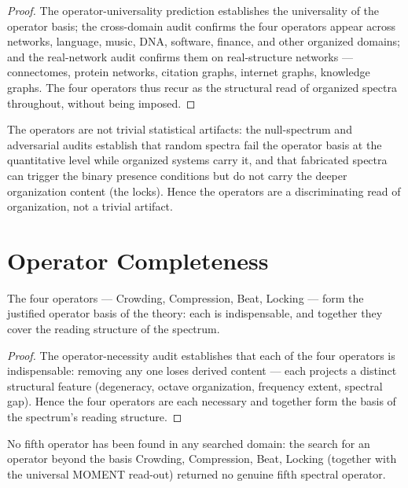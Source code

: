 \begin{proof}
The operator-universality prediction \cite{c07:QG300} establishes the universality of the
operator basis; the cross-domain audit \cite{c07:QG302} confirms the four operators appear
across networks, language, music, DNA, software, finance, and other organized domains; and
the real-network audit \cite{c07:QG304} confirms them on real-structure networks ---
connectomes, protein networks, citation graphs, internet graphs, knowledge graphs. The four
operators thus recur as the structural read of organized spectra throughout, without being
imposed.
\end{proof}

The operators are not trivial statistical artifacts: the null-spectrum and adversarial
audits \cite{c07:QG309,c07:QG312} establish that random spectra fail the operator basis at the
quantitative level while organized systems carry it, and that fabricated spectra can trigger
the binary presence conditions but do not carry the deeper organization content (the locks).
Hence the operators are a discriminating read of organization, not a trivial artifact.

\section{Operator Completeness}
\label{c07:sec:completeness}

\begin{theorem}
\label{c07:thm:four-operators}
The four operators --- Crowding, Compression, Beat, Locking --- form the justified operator
basis of the theory: each is indispensable, and together they cover the reading structure of
the spectrum.
\end{theorem}

\begin{proof}
The operator-necessity audit \cite{c07:QG308} establishes that each of the four operators is
indispensable: removing any one loses derived content --- each projects a distinct
structural feature (degeneracy, octave organization, frequency extent, spectral gap). Hence
the four operators are each necessary and together form the basis of the spectrum's reading
structure.
\end{proof}

\begin{theorem}
\label{c07:thm:no-fifth}
No fifth operator has been found in any searched domain: the search for an operator beyond
the basis {Crowding, Compression, Beat, Locking} (together with the universal MOMENT
read-out) returned no genuine fifth spectral operator.
\end{theorem}

